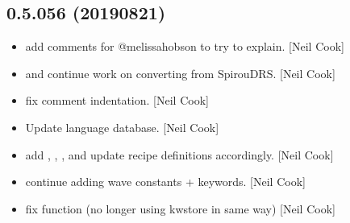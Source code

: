 \documentclass[a4paper,10pt,english]{report}
\begin{document}
\subsection{0.5.056 (2019\sphinxhyphen{}08\sphinxhyphen{}21)}
\label{\detokenize{misc/changelog:id105}}\begin{itemize}
\item {} 
 \sphinxhyphen{} add comments for @melissa\sphinxhyphen{}hobson to try to
explain. {[}Neil Cook{]}

\item {} 
 and  \sphinxhyphen{} continue work on
converting from SpirouDRS. {[}Neil Cook{]}

\item {} 
 \sphinxhyphen{} fix comment indentation. {[}Neil Cook{]}

\item {} 
Update language database. {[}Neil Cook{]}

\item {} 
 \sphinxhyphen{} add ,
, ,  and update recipe
definitions accordingly. {[}Neil Cook{]}

\item {} 
 \sphinxhyphen{} continue adding wave constants + keywords. {[}Neil
Cook{]}

\item {} 
 \sphinxhyphen{} fix  function (no longer using
kwstore in same way) {[}Neil Cook{]}

\end{itemize}
\end{document}
